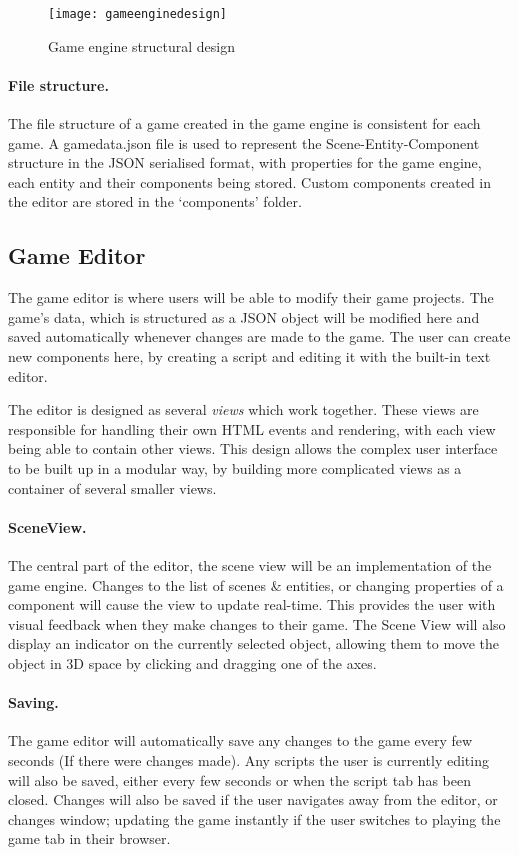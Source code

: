 	\begin{figure}[h]
		\centering
		\texttt{[image: gameenginedesign]}
		\caption{Game engine structural design}
		\label{fig:gameenginedesign}
	\end{figure}

	\paragraph{File structure.}
	The file structure of a game created in the game engine is consistent for each game. A gamedata.json file is used to represent the Scene-Entity-Component structure in the JSON serialised format, with properties for the game engine, each entity and their components being stored. Custom components created in the editor are stored in the `components' folder.

	\subsection{Game Editor}
	The game editor is where users will be able to modify their game projects. The game's data, which is structured as a JSON object will be modified here and saved automatically whenever changes are made to the game. The user can create new components here, by creating a script and editing it with the built-in text editor.

	The editor is designed as several \emph{views} which work together. These views are responsible for handling their own HTML events and rendering, with each view being able to contain other views. This design allows the complex user interface to be built up in a modular way, by building more complicated views as a container of several smaller views.

	\paragraph{SceneView.}
	The central part of the editor, the scene view will be an implementation of the game engine. Changes to the list of scenes \& entities, or changing properties of a component will cause the view to update real-time. This provides the user with visual feedback when they make changes to their game. The Scene View will also display an indicator on the currently selected object, allowing them to move the object in 3D space by clicking and dragging one of the axes.

	\paragraph{Saving.}
	The game editor will automatically save any changes to the game every few seconds (If there were changes made). Any scripts the user is currently editing will also be saved, either every few seconds or when the script tab has been closed. Changes will also be saved if the user navigates away from the editor, or changes window; updating the game instantly if the user switches to playing the game tab in their browser.

